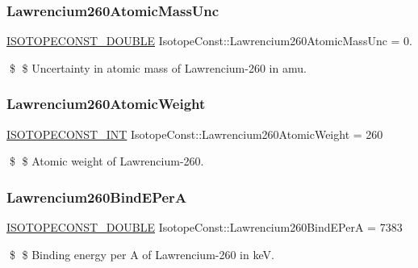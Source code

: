 \subsubsection{\texorpdfstring{Lawrencium260\+Atomic\+Mass\+Unc}{Lawrencium260AtomicMassUnc}}
{\footnotesize\ttfamily \mbox{\hyperlink{group___isotope_const-_macros_ga8f45a7272ce02c0b4c65c44636ed719a}{I\+S\+O\+T\+O\+P\+E\+C\+O\+N\+S\+T\+\_\+\+D\+O\+U\+B\+LE}} Isotope\+Const\+::\+Lawrencium260\+Atomic\+Mass\+Unc = 0.}

\$ \$ Uncertainty in atomic mass of Lawrencium-\/260 in amu. \mbox{\label{group___isotope_const-_lawrencium-_lr260_ga568c0a44c8a895d2e43dea474a0484a3}} 
\subsubsection{\texorpdfstring{Lawrencium260\+Atomic\+Weight}{Lawrencium260AtomicWeight}}
{\footnotesize\ttfamily \mbox{\hyperlink{group___isotope_const-_macros_ga5f18360b3e99483a35c32d789e62621c}{I\+S\+O\+T\+O\+P\+E\+C\+O\+N\+S\+T\+\_\+\+I\+NT}} Isotope\+Const\+::\+Lawrencium260\+Atomic\+Weight = 260}

\$ \$ Atomic weight of Lawrencium-\/260. \mbox{\label{group___isotope_const-_lawrencium-_lr260_gacf35b8212b25666239449785fdbf97b6}} 
\subsubsection{\texorpdfstring{Lawrencium260\+Bind\+E\+PerA}{Lawrencium260BindEPerA}}
{\footnotesize\ttfamily \mbox{\hyperlink{group___isotope_const-_macros_ga8f45a7272ce02c0b4c65c44636ed719a}{I\+S\+O\+T\+O\+P\+E\+C\+O\+N\+S\+T\+\_\+\+D\+O\+U\+B\+LE}} Isotope\+Const\+::\+Lawrencium260\+Bind\+E\+PerA = 7383}

\$ \$ Binding energy per A of Lawrencium-\/260 in keV. \mbox{\label{group___isotope_const-_lawrencium-_lr260_gaa9060abb00557baebcc53ba77ca2b131}} 
